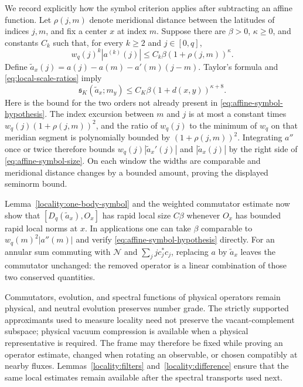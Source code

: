 We record explicitly how the symbol criterion applies after subtracting
an affine function.  Let $\rho(j,m)$ denote meridional distance between
the latitudes of indices $j,m$, and fix a center $x$ at index $m$.
Suppose there are $\beta>0$, $\kappa\geq0$, and constants $C_k$ such
that, for every $k\geq2$ and $j\in[0,q]$,
\begin{equation}
 w_q(j)^k|a^{(k)}(j)|
       \leq C_k\beta(1+\rho(j,m))^\kappa.
 \label{eq:affine-symbol-hypothesis}
\end{equation}
Define $\widetilde a_x(j)=a(j)-a(m)-a'(m)(j-m)$.
Taylor's formula and \eqref{eq:local-scale-ratios} imply
\begin{equation}
 \mathfrak s_K(\widetilde a_x;m_y)
       \leq C_K\beta(1+d(x,y))^{\kappa+8}.
 \label{eq:affine-symbol-size}
\end{equation}
Here is the bound for the two orders not already present in
\eqref{eq:affine-symbol-hypothesis}.  The index excursion between
$m$ and $j$ is at most a constant times
$w_q(j)(1+\rho(j,m))^2$, and the ratio of $w_q(j)$ to the minimum
of $w_q$ on that meridian segment is polynomially bounded by
$(1+\rho(j,m))^2$.  Integrating $a''$ once or twice therefore bounds
$w_q(j)|\widetilde a_x'(j)|$ and $|\widetilde a_x(j)|$ by the
right side of \eqref{eq:affine-symbol-size}.  On each window
the widths are comparable and meridional distance changes by a
bounded amount, proving the displayed seminorm bound.

Lemma~\ref{locality:one-body-symbol} and the weighted commutator
estimate now show that $[D_q(\widetilde a_x),O_x]$ has rapid local
size $C\beta$ whenever $O_x$ has bounded rapid local norms at $x$.
In applications one can take $\beta$ comparable to
$w_q(m)^2|a''(m)|$ and verify
\eqref{eq:affine-symbol-hypothesis} directly.  For an annular sum
commuting with $\mathcal N$ and $\sum_jj c_j^*c_j$, replacing $a$
by $\widetilde a_x$ leaves the commutator unchanged: the removed
operator is a linear combination of those two conserved quantities.

Commutators, evolution, and spectral functions of physical operators
remain physical, and neutral evolution preserves number grade.  The
strictly supported approximants used to measure locality need not
preserve the vacant-complement subspace; physical vacuum compression
is available when a physical representative is required.
The frame may therefore be fixed while proving an operator estimate,
changed when rotating an observable, or chosen compatibly at nearby
fluxes.  Lemmas~\ref{locality:filters} and~\ref{locality:difference}
ensure that the same local estimates remain available after the
spectral transports used next.
